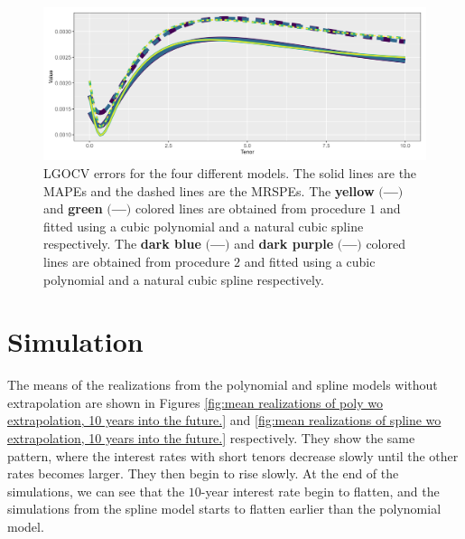 \begin{figure}[!htbp]
    \centering
    \includegraphics[width=.95\linewidth]{Figures/Error/zero_coupon_yields_phase_3_HJM_2F_LGOCV_small_error_plot.png}
    \caption[LGOCV errors for the four different models.]{LGOCV errors for the four different models. The solid lines are the MAPEs and the dashed lines are the MRSPEs. The \textbf{yellow} $\bigl($\textcolor{yellow_}{\textbf{---}}$\bigr)$ and \textbf{green} $\bigl($\textcolor{green_}{\textbf{---}}$\bigr)$ colored lines are obtained from procedure $1$ and fitted using a cubic polynomial and a natural cubic spline respectively. The \textbf{dark blue} $\bigl($\textcolor{dark_blue_1}{\textbf{---}}$\bigr)$ and \textbf{dark purple} $\bigl($\textcolor{dark_purple_}{\textbf{---}}$\bigr)$ colored lines are obtained from procedure $2$ and fitted using a cubic polynomial and a natural cubic spline respectively.}
    \label{fig:Error}
\end{figure}

\newpage

\section{Simulation}
 
\noindent The means of the realizations from the polynomial and spline models without extrapolation are shown in Figures \ref{fig:mean realizations of poly wo extrapolation, 10 years into the future.} and \ref{fig:mean realizations of spline wo extrapolation, 10 years into the future.} respectively. They show the same pattern, where the interest rates with short tenors decrease slowly until the other rates becomes larger. They then begin to rise slowly. At the end of the simulations, we can see that the $10$-year interest rate begin to flatten, and the simulations from the spline model starts to flatten earlier than the polynomial model.

